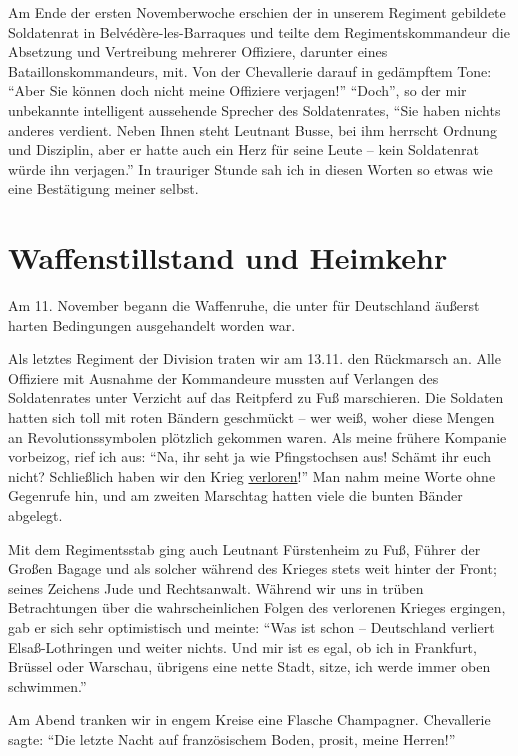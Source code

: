 \documentclass[a5paper,pagesize,10pt,twoside=true]{scrbook}
\begin{document}
Am Ende der ersten Novemberwoche erschien der in unserem Regiment gebildete Soldatenrat in Belvédère-les-Barraques und teilte dem Regimentskommandeur die Absetzung und Vertreibung mehrerer Offiziere, darunter eines Bataillonskommandeurs, mit. Von der Chevallerie darauf in gedämpftem Tone: \enquote{Aber Sie können doch nicht meine Offiziere verjagen!} \enquote{Doch}, so der mir unbekannte intelligent aussehende Sprecher des Soldatenrates, \enquote{Sie haben nichts anderes verdient. Neben Ihnen steht Leutnant Busse, bei ihm herrscht Ordnung und Disziplin, aber er hatte auch ein Herz für seine Leute -- kein Soldatenrat würde ihn verjagen.} In trauriger Stunde sah ich in diesen Worten so etwas wie eine Bestätigung meiner selbst.

\section{Waffenstillstand und Heimkehr}

Am 11. November begann die Waffenruhe, die unter für Deutschland äußerst harten Bedingungen ausgehandelt worden war.

Als letztes Regiment der Division traten wir am 13.11. den Rückmarsch an. Alle Offiziere mit Ausnahme der Kommandeure mussten auf Verlangen des Soldatenrates unter Verzicht auf das Reitpferd zu Fuß marschieren. Die Soldaten hatten sich toll mit roten Bändern geschmückt -- wer weiß, woher diese Mengen an Revolutionssymbolen plötzlich gekommen waren. Als meine frühere Kompanie vorbeizog, rief ich aus: \enquote{Na, ihr seht ja wie Pfingstochsen aus! Schämt ihr euch nicht? Schließlich haben wir den Krieg \underline{verloren}!} Man nahm meine Worte ohne Gegenrufe hin, und am zweiten Marschtag hatten viele die bunten Bänder abgelegt.

Mit dem Regimentsstab ging auch Leutnant Fürstenheim zu Fuß, Führer der Großen Bagage und als solcher während des Krieges stets weit hinter der Front; seines Zeichens Jude und Rechtsanwalt. Während wir uns in trüben Betrachtungen über die wahrscheinlichen Folgen des verlorenen Krieges ergingen, gab er sich sehr optimistisch und meinte: \enquote{Was ist schon -- Deutschland verliert Elsaß-Lothringen und weiter nichts. Und mir ist es egal, ob ich in Frankfurt, Brüssel oder Warschau, übrigens eine nette Stadt, sitze, ich werde immer oben schwimmen.}

Am Abend tranken wir in engem Kreise eine Flasche Champagner. Chevallerie sagte: \enquote{Die letzte Nacht auf französischem Boden, prosit, meine Herren!}
\end{document}
